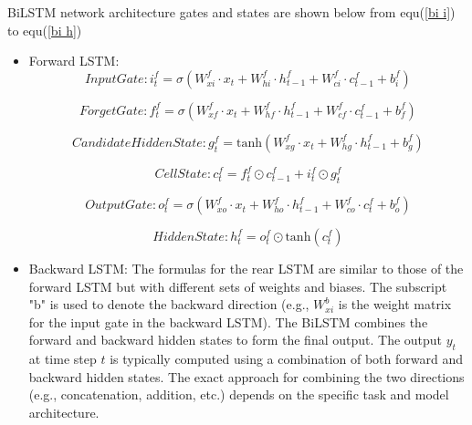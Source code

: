 \documentclass[a4paper,fleqn]{cas-dc}
\begin{document}
BiLSTM network architecture gates and states are shown below from equ(\ref{bi i}) to equ(\ref{bi h})
\begin{itemize}
  \item  Forward LSTM:\\

    \begin{equation} \label{bi i}
      Input Gate : i_t^f = \sigma(W_{xi}^f \cdot x_t + W_{hi}^f \cdot h_{t-1}^f + W_{ci}^f \cdot c_{t-1}^f + b_i^f)
    \end{equation}

    \begin{equation}
      Forget Gate : f_t^f = \sigma(W_{xf}^f \cdot x_t + W_{hf}^f \cdot h_{t-1}^f + W_{cf}^f \cdot c_{t-1}^f + b_f^f) 
    \end{equation}

    \begin{equation}
      Candidate Hidden State :  g_t^f = \text{tanh}(W_{xg}^f \cdot x_t + W_{hg}^f \cdot h_{t-1}^f + b_g^f)
    \end{equation}

    \begin{equation}
      Cell State : c_t^f = f_t^f \odot c_{t-1}^f + i_t^f \odot g_t^f
    \end{equation}

    \begin{equation}
      Output Gate : o_t^f = \sigma(W_{xo}^f \cdot x_t + W_{ho}^f \cdot h_{t-1}^f + W_{co}^f \cdot c_t^f + b_o^f)
    \end{equation}

    \begin{equation} \label{bi h}
      Hidden State :  h_t^f = o_t^f \odot \text{tanh}(c_t^f) 
    \end{equation}

  \item Backward LSTM:
  The formulas for the rear LSTM are similar to those of the forward LSTM but with different sets of weights and biases. The subscript "b" is used to denote the backward direction (e.g., \(W_{xi}^b\) is the weight matrix for the input gate in the backward LSTM). The BiLSTM combines the forward and backward hidden states to form the final output. The output \(y_t\) at time step \(t\) is typically computed using a combination of both forward and backward hidden states. The exact approach for combining the two directions (e.g., concatenation, addition, etc.) depends on the specific task and model architecture.
\end{itemize}
\end{document}
